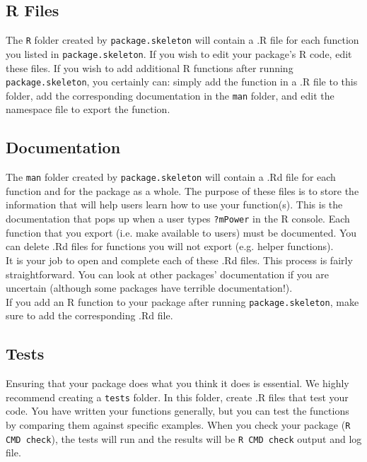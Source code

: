 \documentclass{article}
\begin{document}
\subsection{R Files} 
The \texttt{R} folder created by  \texttt{package.skeleton} will contain a .R file for each function you listed in   \texttt{package.skeleton}. If you wish to edit your package's R code, edit these files. If you wish to add additional R functions after running  \texttt{package.skeleton}, you certainly can: simply add the function in a .R file to this folder, add the corresponding documentation in the \texttt{man} folder, and edit the namespace file to export the function.

\subsection{Documentation}
The \texttt{man} folder created by  \texttt{package.skeleton} will contain a .Rd file for each function and for the package as a whole.  The purpose of these files is to store the information that will help users learn how to use your function(s). This is the documentation that pops up when a user types \texttt{?mPower} in the R console. Each function that you export (i.e. make available to users) must be documented. You can delete .Rd files for functions you will not export (e.g. helper functions).  \\

It is your job to open and complete each of these  .Rd files. This process is fairly straightforward. You can look at other packages'  documentation if you are uncertain (although some packages have terrible documentation!). \\

If you add an R function to your package after running \texttt{package.skeleton}, make sure to add the corresponding .Rd file.


\subsection{Tests}\label{sec:tests} Ensuring that your package does what you think it does is essential. We highly recommend creating a \texttt{tests} folder. In this folder, create .R files that test your code. 
You have written your functions generally, but you can test the functions by comparing them against specific examples. When you check your package (\texttt{R CMD check}), the tests will run and the results will be  \texttt{R CMD check} output and log file.\\
\end{document}
